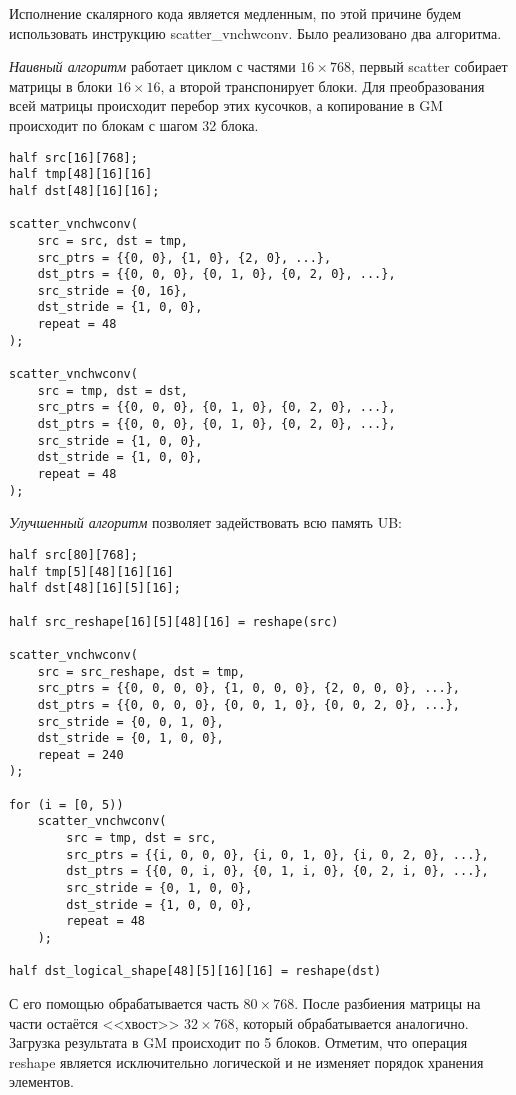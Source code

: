Исполнение скалярного кода является медленным, по этой причине будем
использовать инструкцию scatter\_vnchwconv. Было реализовано два алгоритма.

\textit{Наивный алгоритм} работает циклом с частями $16 \times 768$, первый
scatter собирает матрицы в блоки $16 \times 16$, а второй транспонирует
блоки. Для преобразования всей матрицы происходит перебор этих кусочков,
а копирование в GM происходит по блокам с шагом 32 блока.

\begin{lstlisting}[caption={Наивный алгоритм фрактализации}]
half src[16][768];
half tmp[48][16][16]
half dst[48][16][16];

scatter_vnchwconv(
    src = src, dst = tmp,
    src_ptrs = {{0, 0}, {1, 0}, {2, 0}, ...},
    dst_ptrs = {{0, 0, 0}, {0, 1, 0}, {0, 2, 0}, ...},
    src_stride = {0, 16},
    dst_stride = {1, 0, 0},
    repeat = 48
);

scatter_vnchwconv(
    src = tmp, dst = dst,
    src_ptrs = {{0, 0, 0}, {0, 1, 0}, {0, 2, 0}, ...},
    dst_ptrs = {{0, 0, 0}, {0, 1, 0}, {0, 2, 0}, ...},
    src_stride = {1, 0, 0},
    dst_stride = {1, 0, 0},
    repeat = 48
);
\end{lstlisting}

\textit{Улучшенный алгоритм} позволяет задействовать всю память UB:

\begin{lstlisting}[caption={Продвинутый алгоритм фрактализации}]
half src[80][768];
half tmp[5][48][16][16]
half dst[48][16][5][16];

half src_reshape[16][5][48][16] = reshape(src)

scatter_vnchwconv(
    src = src_reshape, dst = tmp,
    src_ptrs = {{0, 0, 0, 0}, {1, 0, 0, 0}, {2, 0, 0, 0}, ...},
    dst_ptrs = {{0, 0, 0, 0}, {0, 0, 1, 0}, {0, 0, 2, 0}, ...},
    src_stride = {0, 0, 1, 0},
    dst_stride = {0, 1, 0, 0},
    repeat = 240
);

for (i = [0, 5))
    scatter_vnchwconv(
        src = tmp, dst = src,
        src_ptrs = {{i, 0, 0, 0}, {i, 0, 1, 0}, {i, 0, 2, 0}, ...},
        dst_ptrs = {{0, 0, i, 0}, {0, 1, i, 0}, {0, 2, i, 0}, ...},
        src_stride = {0, 1, 0, 0},
        dst_stride = {1, 0, 0, 0},
        repeat = 48
    );

half dst_logical_shape[48][5][16][16] = reshape(dst)
\end{lstlisting}

С его помощью обрабатывается часть $80 \times 768$. После разбиения матрицы
на части остаётся <<хвост>> $32 \times 768$, который обрабатывается аналогично.
Загрузка результата в GM происходит по 5 блоков. Отметим, что операция reshape
является исключительно логической и не изменяет порядок хранения элементов.


